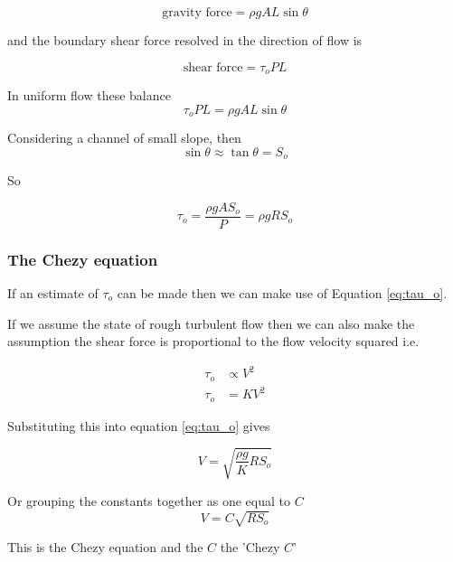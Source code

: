 \documentclass[a4paper, 12pt, british]{article} %
\numberwithin{equation}{section}
\numberwithin{figure}{section}
\numberwithin{table}{section}
\begin{document}
\begin{equation}
\text{gravity force} = \rho g A L \sin \theta
\end{equation}
 

and the boundary shear force resolved in the direction of flow is 

\begin{equation}
\text{shear force} = \tau_o P L
\end{equation}
 

In uniform flow these balance
 \begin{equation}
  \tau_o P L = \rho g A L \sin \theta
 \end{equation}
 


Considering a channel of small slope, then
 \begin{equation}
\sin \theta \approx \tan \theta = S_o
\end{equation}


So

 \begin{equation}
\tau_o = \frac{\rho g A S_o}{P} = \rho g R S_o
\label{eq:tau_o}
\end{equation}

\subsubsection{The Chezy equation}

If an estimate of $\tau_o$ can be made then we can make use of Equation \ref{eq:tau_o}.

If we assume the state of rough turbulent flow then we can also make the assumption the shear force is proportional to the flow velocity squared i.e.

 \begin{align*}
\tau_o &\propto V^2 \\
\tau_o &= K V^2
\end{align*}
 

Substituting this into equation \ref{eq:tau_o} gives


\begin{equation}
V = \sqrt{\frac{\rho g}{K}R S_o}
\end{equation} 

Or grouping the constants together as one equal to $C$
\begin{equation}
V = C\sqrt{R S_o}
\label{eq:chezy_v}
\end{equation} 

This is the Chezy equation and the $C$ the 'Chezy $C$'
\end{document}
